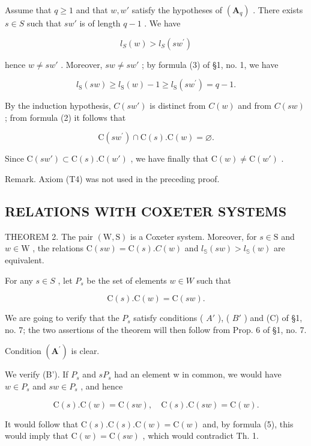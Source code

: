 Assume that \(q \geqslant 1\) and that \(w, w'\) satisfy the hypotheses of \((\mathbf{A}_q)\) . There exists \(s \in S\) such that \(sw'\) is of length \(q - 1\) . We have

\[
l _ {S} (w) > l _ {S} \left(s w ^ {\prime}\right)\tag{6}
\]

hence \(w \neq sw'\) . Moreover, \(sw \neq sw'\) ; by formula (3) of §1, no. 1, we have

\[
l _ {\mathrm{S}} (s w) \geqslant l _ {\mathrm{S}} (w) - 1 \geqslant l _ {\mathrm{S}} (s w ^ {\prime}) = q - 1.\tag{7}
\]

By the induction hypothesis, \(C(sw')\) is distinct from \(C(w)\) and from \(C(sw)\) ; from formula (2) it follows that

\[
\mathrm{C} (s w ^ {\prime}) \cap \mathrm{C} (s). \mathrm{C} (w) = \varnothing .\tag{8}
\]

Since \(\mathrm{C}(sw') \subset \mathrm{C}(s).\mathrm{C}(w')\) , we have finally that \(\mathrm{C}(w) \neq \mathrm{C}(w')\) .

Remark. Axiom (T4) was not used in the preceding proof.

\subsection{RELATIONS WITH COXETER SYSTEMS}

THEOREM 2. The pair \((\mathrm{W},\mathrm{S})\) is a Coxeter system. Moreover, for \(s\in \mathrm{S}\) and \(w\in \mathrm{W}\) , the relations \(\mathrm{C}(sw) = \mathrm{C}(s).C(w)\) and \(l_{\mathbb{S}}(sw) > l_{\mathbb{S}}(w)\) are equivalent.

For any \(s \in S\) , let \(P_s\) be the set of elements \(w \in W\) such that

\[
\mathrm{C} (s). \mathrm{C} (w) = \mathrm{C} (s w).
\]

We are going to verify that the \(P_{s}\) satisfy conditions ( \(A'\) ), ( \(B'\) ) and (C) of §1, no. 7; the two assertions of the theorem will then follow from Prop. 6 of §1, no. 7.

Condition \((\mathbf{A}^{\prime})\) is clear.

We verify (B'). If \(P_{s}\) and \(sP_{s}\) had an element w in common, we would have \(w \in P_{s}\) and \(sw \in P_{s}\) , and hence

\[
\mathrm{C} (s). \mathrm{C} (w) = \mathrm{C} (s w), \quad \mathrm{C} (s). \mathrm{C} (s w) = \mathrm{C} (w).
\]

It would follow that \(\mathrm{C}(s).\mathrm{C}(s).\mathrm{C}(w) = \mathrm{C}(w)\) and, by formula (5), this would imply that \(\mathrm{C}(w) = \mathrm{C}(sw)\) , which would contradict Th. 1.

